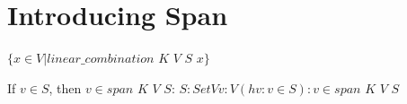 \section{Introducing Span}


\begin{definition}
  \label{definition : span}
  \leanok
  $\{ x \in V | linear\_combination$ $K$ $V$ $S$ $x \}$
\end{definition}

\begin{theorem}
  \label{theorem : mem_span_of_mem}
  \leanok
  If $v \in S$, then $v \in span$ $K$ $V$ $S$: ${S : Set V} {v : V} (hv : v \in S) : v \in span$ $K$ $V$ $S$
\end{theorem}
